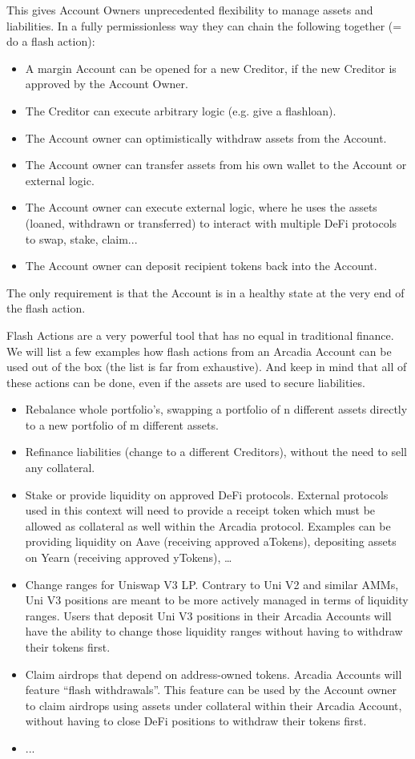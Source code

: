 \documentclass[sigconf,nonacm]{acmart}
\begin{document}
This gives Account Owners unprecedented flexibility to manage assets and liabilities.
In a fully permissionless way they can chain the following together (= do a flash action):
\begin{itemize}
    \item A margin Account can be opened for a new Creditor, if the new Creditor is approved by the Account Owner.
    \item The Creditor can execute arbitrary logic (e.g. give a flashloan).
    \item The Account owner can optimistically withdraw assets from the Account.
    \item The Account owner can transfer assets from his own wallet to the Account or external logic.
    \item The Account owner can execute external logic, where he uses the assets (loaned, withdrawn or transferred) to interact with multiple DeFi protocols to swap, stake, claim...
    \item The Account owner can deposit recipient tokens back into the Account.
\end{itemize}
The only requirement is that the Account is in a healthy state at the very end of the flash action.

Flash Actions are a very powerful tool that has no equal in traditional finance.
We will list a few examples how flash actions from an Arcadia Account can be used out of the box (the list is far from exhaustive).
And keep in mind that all of these actions can be done, even if the assets are used to secure liabilities.

\begin{itemize}
    \item Rebalance whole portfolio's, swapping a portfolio of n different assets directly to a new portfolio of m different assets.
    \item Refinance liabilities (change to a different Creditors), without the need to sell any collateral.
    \item Stake or provide liquidity on approved DeFi protocols.
    External protocols used in this context will need to provide a receipt token which must be allowed as collateral as well within the Arcadia protocol.
    Examples can be providing liquidity on Aave (receiving approved aTokens), depositing assets on Yearn (receiving approved yTokens), …
    \item Change ranges for Uniswap V3 LP. Contrary to Uni V2 and similar AMMs, Uni V3 positions are meant to be more actively managed in terms of liquidity ranges.
    Users that deposit Uni V3 positions in their Arcadia Accounts will have the ability to change those liquidity ranges without having to withdraw their tokens first.
    \item Claim airdrops that depend on address-owned tokens. Arcadia Accounts will feature “flash withdrawals”.
    This feature can be used by the Account owner to claim airdrops using assets under collateral within their Arcadia Account, without having to close DeFi positions to withdraw their tokens first.
    \item ...
\end{itemize}
\end{document}
